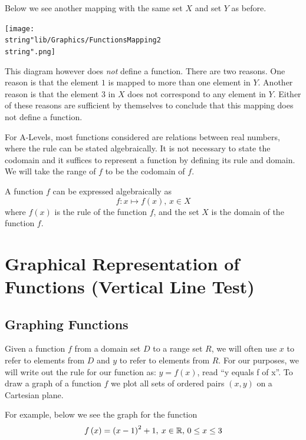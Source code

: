 \documentclass[11pt,a4paper]{book}
\newcommand{\R}{\mathbb{R}}
\begin{document}
Below we see another mapping with the same set $X$ and set $Y$ as
before.
\begin{center}
\texttt{[image: \\string"lib/Graphics/FunctionsMapping2\\string".png]}
\par\end{center}

This diagram however does \textit{not} define a function. There are
two reasons. One reason is that the element $1$ is mapped to more than one element in $Y$. Another reason is that the element $3$ in $X$ does not correspond to any element in $Y$. Either of these reasons are sufficient by themselves to conclude that this mapping does not define a function.

\medskip{}

For A-Levels, most functions considered are relations between real numbers, where the rule can be stated algebraically. It is not necessary to state the codomain and it suffices to represent a function by defining its rule and domain. We will take the range of $f$ to be the codomain of $f$.

A function $f$ can be expressed algebraically as
\[
f:x\mapsto f\left(x\right),\,x\in X
\]
where $f\left(x\right)$ is the rule of the function $f$, and the
set $X$ is the domain of the function $f$.

\newpage

\section{Graphical Representation of Functions (Vertical Line Test)}

\subsection{Graphing Functions}

Given a function $f$ from a domain set $D$ to a range set $R$, we will often use $x$ to refer to elements from $D$ and $y$ to refer to elements from $R$. For our purposes, we will write out the rule for our function as: $y=f(x)$, read \textquotedblleft y equals f of x\textquotedblright . To draw a graph of a function $f$ we plot all sets of ordered pairs $\left(x,y\right)$ on a Cartesian plane.

For example, below we see the graph for the function
\[
f\left(x\right)=\left(x-1\right)^{2}+1,\:x\in\R\text{, \ensuremath{0\leq x\leq3}}
\]
\end{document}
